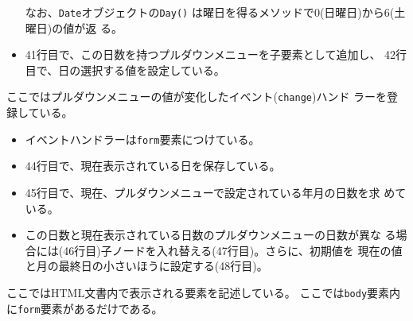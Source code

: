 \begin{Exec}
\begin{itemize}
			 なお、\texttt{Date}オブジェクトの\texttt{Day()}
       は曜日を得るメソッドで$0$(日曜日)から$6$(土曜日)の値が返
       る。
 \item 41行目で、この日数を持つプルダウンメニューを子要素として追加し、
			 42行目で、日の選択する値を設定している。
\end{itemize}
 ここではプルダウンメニューの値が変化したイベント(\texttt{change})ハンド
 ラーを登録している。
\begin{itemize}
 \item イベントハンドラーは\texttt{form}要素につけている。
 \item 44行目で、現在表示されている日を保存している。
 \item 45行目で、現在、プルダウンメニューで設定されている年月の日数を求
       めている。
 \item この日数と現在表示されている日数のプルダウンメニューの日数が異な
       る場合には(46行目)子ノードを入れ替える(47行目)。さらに、初期値を
       現在の値と月の最終日の小さいほうに設定する(48行目)。
\end{itemize}
ここではHTML文書内で表示される要素を記述している。
ここでは\texttt{body}要素内に\texttt{form}要素があるだけである。
\end{Exec}
